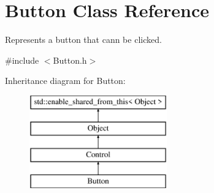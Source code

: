 \hypertarget{class_button}{}\section{Button Class Reference}
\label{class_button}


Represents a button that cann be clicked.  




{\ttfamily \#include $<$Button.\+h$>$}

Inheritance diagram for Button\+:\begin{figure}[H]
\begin{center}
\leavevmode
\includegraphics[height=4.000000cm]{class_button}
\end{center}
\end{figure}
